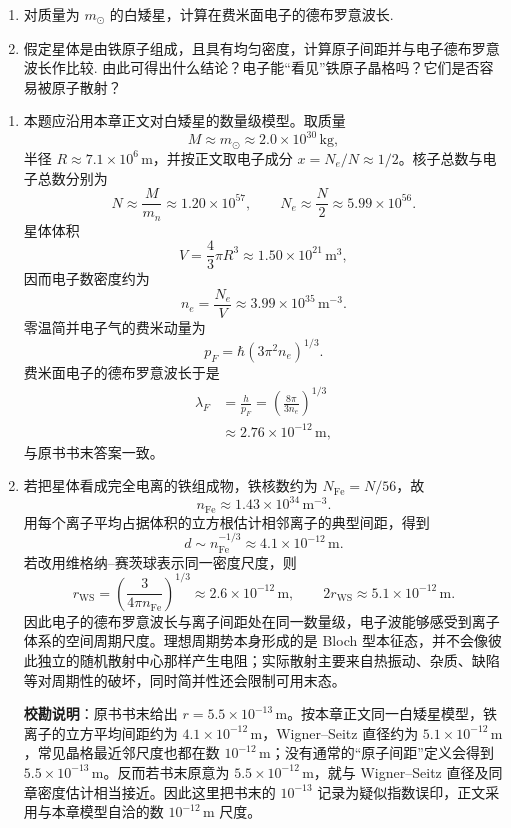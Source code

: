 \begin{exercise}\label{ex:31.1}
\begin{enumerate}
  \item[(a)] 对质量为 $m_\odot$ 的白矮星，计算在费米面电子的德布罗意波长. 
  \item[(b)] 假定星体是由铁原子组成，且具有均匀密度，计算原子间距并与电子德布罗意波长作比较. 由此可得出什么结论？电子能“看见”铁原子晶格吗？它们是否容易被原子散射？
\end{enumerate}
\end{exercise}
\begin{solution}
\begin{enumerate}
    \item[(a)] 本题应沿用本章正文对白矮星的数量级模型。取质量
    $$ M\approx m_\odot\approx2.0\times10^{30}\,\mathrm{kg}, $$
    半径 $R\approx7.1\times10^6\,\mathrm{m}$，并按正文取电子成分 $x=N_e/N\approx1/2$。核子总数与电子总数分别为
    $$ N\approx\frac{M}{m_n}\approx1.20\times10^{57},\qquad
       N_e\approx\frac{N}{2}\approx5.99\times10^{56}. $$
    星体体积
    $$ V=\frac{4}{3}\pi R^3\approx1.50\times10^{21}\,\mathrm{m^3}, $$
    因而电子数密度约为
    $$ n_e=\frac{N_e}{V}\approx3.99\times10^{35}\,\mathrm{m^{-3}}. $$
    零温简并电子气的费米动量为
    $$ p_F=\hbar(3\pi^2n_e)^{1/3}. $$
    费米面电子的德布罗意波长于是
    \begin{align*}
    \lambda_F&=\frac{h}{p_F}
      =\left(\frac{8\pi}{3n_e}\right)^{1/3} \\
      &\approx2.76\times10^{-12}\,\mathrm{m},
    \end{align*}
    与原书书末答案一致。

    \item[(b)] 若把星体看成完全电离的铁组成物，铁核数约为 $N_{\mathrm{Fe}}=N/56$，故
    $$ n_{\mathrm{Fe}}\approx1.43\times10^{34}\,\mathrm{m^{-3}}. $$
    用每个离子平均占据体积的立方根估计相邻离子的典型间距，得到
    $$ d\sim n_{\mathrm{Fe}}^{-1/3}\approx4.1\times10^{-12}\,\mathrm{m}. $$
    若改用维格纳--赛茨球表示同一密度尺度，则
    $$ r_{\mathrm{WS}}=\left(\frac{3}{4\pi n_{\mathrm{Fe}}}\right)^{1/3}
       \approx2.6\times10^{-12}\,\mathrm{m},\qquad
       2r_{\mathrm{WS}}\approx5.1\times10^{-12}\,\mathrm{m}. $$
    因此电子的德布罗意波长与离子间距处在同一数量级，电子波能够感受到离子体系的空间周期尺度。理想周期势本身形成的是 Bloch 型本征态，并不会像彼此独立的随机散射中心那样产生电阻；实际散射主要来自热振动、杂质、缺陷等对周期性的破坏，同时简并性还会限制可用末态。

    \textbf{校勘说明}：原书书末给出 $r=5.5\times10^{-13}\,\mathrm{m}$。按本章正文同一白矮星模型，铁离子的立方平均间距约为 $4.1\times10^{-12}\,\mathrm m$，Wigner--Seitz 直径约为 $5.1\times10^{-12}\,\mathrm m$，常见晶格最近邻尺度也都在数 $10^{-12}\,\mathrm m$；没有通常的“原子间距”定义会得到 $5.5\times10^{-13}\,\mathrm m$。反而若书末原意为 $5.5\times10^{-12}\,\mathrm m$，就与 Wigner--Seitz 直径及同章密度估计相当接近。因此这里把书末的 $10^{-13}$ 记录为疑似指数误印，正文采用与本章模型自洽的数 $10^{-12}\,\mathrm m$ 尺度。
\end{enumerate}
\end{solution}

